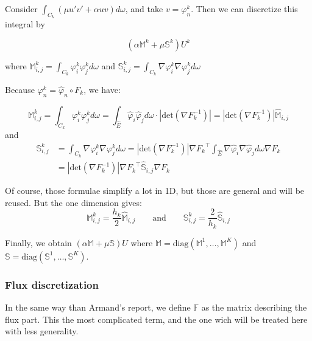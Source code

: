\documentclass[a4paper,10pt,draft]{article}
\begin{document}
Consider $\int_{C_k} (\mu u'v' + \alpha uv) d\omega$, and take $v = \varphi_n^k$. Then 
we can discretize this integral by

\begin{equation}
 \left( \alpha \mathbb{M}^k + \mu \mathbb{S}^k  \right) U^k
\end{equation}

where $\mathbb{M}^k_{i,j} = \int_{C_k} \varphi_i^k \varphi_j^k d\omega$ and $\mathbb{S}_{i,j}^k =
\int_{C_k} \nabla \varphi_i^k \nabla \varphi_j^k d\omega$

Because $\varphi_n^k = \hat 
\varphi_n \circ F_k$, we have:

\begin{equation*}
 \mathbb{M}^k_{i,j} = \int_{C_k} \varphi_i^k \varphi_j^k d\omega = \int_{\hat E} \hat \varphi_i 
\hat \varphi_j d\omega \cdot |\mathrm{det}(\nabla F_k^{-1})| = |\mathrm{det}(\nabla F_k^{-1})| 
{\widehat{\mathbb{M}}}_{i,j}
\end{equation*}
and
\begin{align*}
 \mathbb{S}_{i,j}^k &= \int_{C_k} \nabla \varphi_i^k \nabla \varphi_j^k d\omega = 
|\mathrm{det}(\nabla F_k^{-1})| {\nabla F_k}^\top \int_{\hat E} \nabla \hat \varphi_i \nabla \hat 
\varphi_j d\omega \nabla F_k \\
&= |\mathrm{det}(\nabla F_k^{-1})| {\nabla F_k}^\top 
\widehat{\mathbb{S}}_{i,j} \nabla F_k
\end{align*}

Of course, those formulae simplify a lot in 1D, but those are general and will be reused. But the 
one dimension gives:
\begin{equation*}
 \mathbb{M}^k_{i,j} = \frac{h_k}{2} {\widehat{\mathbb{M}}}_{i,j} \qquad \text{and} \qquad
 \mathbb{S}_{i,j}^k = \frac{2}{h_k} \widehat{\mathbb{S}}_{i,j}
\end{equation*}

Finally, we obtain $(\alpha \mathbb{M} + \mu \mathbb{S})U$ where $\mathbb{M} = \mathrm{diag} ( 
\mathbb{M}^1, \dots, \mathbb{M}^K)$ and  $\mathbb{S} = \mathrm{diag} 
(\mathbb{S}^1,\dots,\mathbb{S}^K)$.

\subsubsection{Flux discretization}

In the same way than Armand's report, we define $\mathbb{F}$ as the matrix describing the flux 
part. This the most complicated term, and the one wich will be treated here with less generality.
\end{document}
